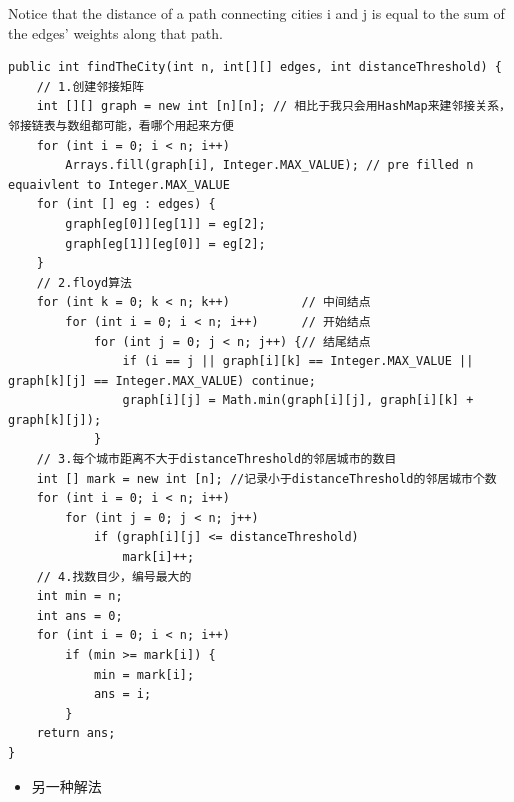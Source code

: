 \documentclass[9pt, b5paaper]{book}
\begin{document}
Notice that the distance of a path connecting cities i and j is equal to the sum of the edges' weights along that path.
\begin{verbatim}
public int findTheCity(int n, int[][] edges, int distanceThreshold) {
    // 1.创建邻接矩阵
    int [][] graph = new int [n][n]; // 相比于我只会用HashMap来建邻接关系，邻接链表与数组都可能，看哪个用起来方便
    for (int i = 0; i < n; i++)
        Arrays.fill(graph[i], Integer.MAX_VALUE); // pre filled n equaivlent to Integer.MAX_VALUE
    for (int [] eg : edges) {
        graph[eg[0]][eg[1]] = eg[2];
        graph[eg[1]][eg[0]] = eg[2];
    }
    // 2.floyd算法
    for (int k = 0; k < n; k++)          // 中间结点
        for (int i = 0; i < n; i++)      // 开始结点
            for (int j = 0; j < n; j++) {// 结尾结点
                if (i == j || graph[i][k] == Integer.MAX_VALUE || graph[k][j] == Integer.MAX_VALUE) continue;
                graph[i][j] = Math.min(graph[i][j], graph[i][k] + graph[k][j]);
            }                
    // 3.每个城市距离不大于distanceThreshold的邻居城市的数目
    int [] mark = new int [n]; //记录小于distanceThreshold的邻居城市个数
    for (int i = 0; i < n; i++) 
        for (int j = 0; j < n; j++) 
            if (graph[i][j] <= distanceThreshold)
                mark[i]++;
    // 4.找数目少，编号最大的
    int min = n;
    int ans = 0;
    for (int i = 0; i < n; i++) 
        if (min >= mark[i]) {
            min = mark[i];
            ans = i;
        }
    return ans;
}
\end{verbatim}
\begin{itemize}
\item 另一种解法
\end{itemize}
\end{document}
